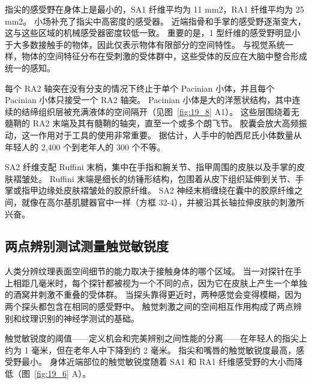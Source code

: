 指尖的感受野在身体上是最小的，SA1 纤维平均为 11 mm2，RA1 纤维平均为 25 mm2。
小场补充了指尖中高密度的感受器。
近端指骨和手掌的感受野逐渐变大，这与这些区域的机械感受器密度较低一致。
重要的是，1 型纤维的感受野明显小于大多数接触手的物体，因此仅表示物体有限部分的空间特性。
与视觉系统一样，物体的空间特征分布在受刺激的受体群中，这些受体的反应在大脑中整合形成统一的感知。


每个 RA2 轴突在没有分支的情况下终止于单个 Pacinian 小体，并且每个 Pacinian 小体只接受一个 RA2 轴突。
Pacinian 小体是大的洋葱状结构，其中连续的结缔组织层被充满液体的空间隔开（见图~\ref{fig:19_8} A1）。
这些层围绕着无髓鞘的 RA2 末端及其有髓鞘的轴突，直至一个或多个朗飞节。
胶囊会放大高频振动，这一作用对于工具的使用非常重要。
据估计，人手中的帕西尼氏小体数量从年轻人的 2,400 个到老年人的 300 个不等。


SA2 纤维支配 Ruffini 末梢，集中在手指和腕关节、指甲周围的皮肤以及手掌的皮肤褶皱处。
Ruffini 末端是细长的纺锤形结构，包围着从皮下组织延伸到关节、手掌或指甲边缘处皮肤褶皱处的胶原纤维。 
SA2 神经末梢缠绕在囊中的胶原纤维之间，就像在高尔基肌腱器官中一样（方框 32-4），并被沿其长轴拉伸皮肤的刺激所兴奋。



\subsection{两点辨别测试测量触觉敏锐度}

人类分辨纹理表面空间细节的能力取决于接触身体的哪个区域。
当一对探针在手上相距几毫米时，每个探针都被视为一个不同的点，因为它在皮肤上产生一个单独的酒窝并刺激不重叠的受体群。
当探头靠得更近时，两种感觉会变得模糊，因为两个探头都包含在相同的感受野中。
触觉刺激之间的空间相互作用构成了两点辨别和纹理识别的神经学测试的基础。


触觉敏锐度的阈值——定义机会和完美辨别之间性能的分离——在年轻人的指尖上约为 1 毫米，但在老年人中下降到约 2 毫米。
指尖和嘴唇的触觉敏锐度最高，感受野最小。
身体近端部位的触觉敏锐度随着 SA1 和 RA1 纤维感受野的大小而降低（图~\ref{fig:19_6} A）。


